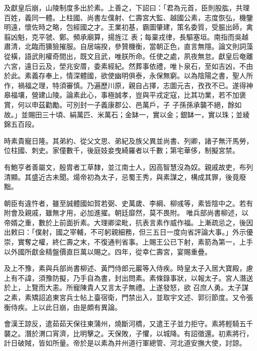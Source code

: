 \begin{pinyinscope}
 及獻皇后崩，山陵制度多出於素。上善之，下詔曰：「君為元首，臣則股肱，共理百姓，義同一體。上柱國、尚書左僕射、仁壽宮大監、越國公素，志度恢弘，機鑒明遠，懷佐時之略，包經國之才。王業初基，霸圖肇建，策名委質，受脤出師，禽翦凶魁，克平虢、鄭。頻承廟算，揚旌江
 表；每稟戎律，長驅塞垣。南指而吳越肅清，北臨而獯獫摧服。自居端揆，參贊機衡，當朝正色，直言無隱。論文則詞藻從橫，語武則權奇間出，既文且武，唯朕所命。任使之處，夙夜無怠。獻皇后奄離六宮，遠日云及，塋兆安厝，委素經紀。然葬事依禮，唯卜泉石，至如吉凶，不由於此。素義存奉上，情深體國，欲使幽明俱泰，永保無窮。以為陰陽之書，聖人所作，禍福之理，特須審慎。乃遍歷川原，親自占擇，志圖元吉，孜孜不已。遂得神皋福壤，營建山陵。論素此心，事極誠孝，豈與平戎定寇，比其功業，若不加褒賞，何以申茲勸勵。可別封一子義康郡公、邑萬戶，子
 子孫孫承襲不絕，餘如故。」並賜田三十頃、絹萬匹、米萬石；金缽一，實以金；銀缽一，實以珠；並綾錦五百段。



 時素貴寵日隆。其弟約、從父文思、弟紀及族父異並尚書、列卿，諸子無汗馬勞，位柱國、刺史。家僮數千，後庭妓妾曳綺羅者以千數；第宅華侈，制擬宮禁。



 有鮑亨者善屬文，殷胄者工草隸，並江南士人，因高智慧沒為奴。親戚故吏，布列清顯。其盛近古未聞。煬帝初為太子，忌蜀王秀，與素謀之，構成其罪，後竟廢黜。



 朝臣有違忤者，雖至誠體國如賀若弼、史萬歲、李綱、柳彧等，素皆陰中之。若有附會及親戚，雖無才用，必加進擢。朝廷靡然，莫不畏附。
 唯兵部尚書柳述，以帝婿之重，數於上前面折素。大理卿梁毗，抗表言素作威作福。上漸疏忌之，後因出敕曰：「僕射，國之宰輔，不可躬親細務，但三五日一度向省評論大事。」外示優崇，實奪之權，終仁壽之末，不復通判省事。上賜王公已下射，素箭為第一，上手以外國所獻金精盤價直巨萬以賜之。四年，從幸仁壽宮，宴賜重疊。



 及上不豫，素與兵部尚書柳述、黃門侍郎元巖等入侍疾。時皇太子入居大寶殿，慮上有不諱，須豫防擬，乃手自為書，封出問素。素條錄事狀，以報太子。宮人潛送於上，上覽而大恚。所寵陳貴人又言太子無禮。上遂發怒，欲
 召庶人勇。太子謀之素，素矯詔追東宮兵士帖上臺宿衛，門禁出入，並取宇文述、郭衍節度。又令張衡侍疾。上以此日崩，由是頗有異論。



 會漢王諒反，遣茹茹天保往東蒲州，燒斷河橋，又遣王子並力拒守。素將輕騎五千襲之。潛於渭口宵濟，比明擊之。天保敗，子懼，以城降。有詔徵還。初素將行，計日破賊，皆如所量。帝於是以素為并州道行軍總管、河北道安撫大使，討諒。




\end{pinyinscope}
